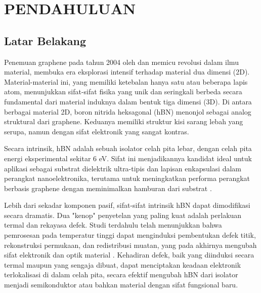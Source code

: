 \renewcommand{\thechapter}{\Roman{chapter}}
\chapter{PENDAHULUAN}
\renewcommand{\thechapter}{\arabic{chapter}}
\pagestyle{konten}

\section{Latar Belakang}
Penemuan graphene pada tahun 2004 oleh \citep{Novoselov2004} dan \citep{Geim2007} memicu revolusi dalam ilmu material, membuka era eksplorasi intensif terhadap material dua dimensi (2D). Material-material ini, yang memiliki ketebalan hanya satu atau beberapa lapis atom, menunjukkan sifat-sifat fisika yang unik dan seringkali berbeda secara fundamental dari material induknya dalam bentuk tiga dimensi (3D). Di antara berbagai material 2D, boron nitrida heksagonal (hBN) menonjol sebagai analog struktural dari graphene. Keduanya memiliki struktur kisi sarang lebah yang serupa, namun dengan sifat elektronik yang sangat kontras.

Secara intrinsik, hBN adalah sebuah isolator celah pita lebar, dengan celah pita energi eksperimental sekitar 6 eV. Sifat ini menjadikannya kandidat ideal untuk aplikasi sebagai substrat dielektrik ultra-tipis dan lapisan enkapsulasi dalam perangkat nanoelektronika, terutama untuk meningkatkan performa perangkat berbasis graphene dengan meminimalkan hamburan dari substrat \citep{Dean2010}.

Lebih dari sekadar komponen pasif, sifat-sifat intrinsik hBN dapat dimodifikasi secara dramatis. Dua "kenop" penyetelan yang paling kuat adalah perlakuan termal dan rekayasa defek. Studi terdahulu telah menunjukkan bahwa pemrosesan pada temperatur tinggi dapat menginduksi pembentukan defek titik, rekonstruksi permukaan, dan redistribusi muatan, yang pada akhirnya mengubah sifat elektronik dan optik material \citep{Zhang2020, Huang2012}. Kehadiran defek, baik yang diinduksi secara termal maupun yang sengaja dibuat, dapat menciptakan keadaan elektronik terlokalisasi di dalam celah pita, secara efektif mengubah hBN dari isolator menjadi semikonduktor atau bahkan material dengan sifat fungsional baru.

